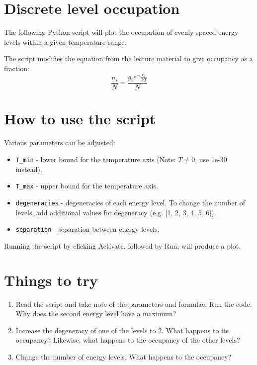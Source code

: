 \documentclass{article}
\begin{document}
\section{Discrete level occupation}

The following Python script will plot the occupation of evenly spaced energy levels within a given temperature range. \par\medskip 
\noindent The script modifies the equation from the lecture material to give occupancy as a fraction:
\[\frac{n_i}{N} = \frac{g_ie^-\frac{e_i}{kT}}{N} \]

\section{How to use the script}
Various parameters can be adjusted: 
\begin{itemize}
\item \texttt{T\_min} - lower bound for the temperature axis (Note: $T\neq0$, use 1e-30 instead).
\item \texttt{T\_max} - upper bound for the temperature axis.
\item \texttt{degeneracies} - degeneracies of each energy level. To change the number of levels, add additional values for degeneracy (e.g. [1, 2, 3, 4, 5, 6]).
\item \texttt{separation} - separation between energy levels.
\end{itemize}
Running the script by clicking Activate, followed by Run, will produce a plot.


\section{Things to try}
\begin{enumerate}
\item Read the script and take note of the parameters and formulae. Run the code. Why does the second energy level have a maximum?
\item Increase the degeneracy of one of the levels to 2. What happens to its occupancy? Likewise, what happens to the occupancy of the other levels?
\item Change the number of energy levels. What happens to the occupancy?
\end{enumerate}
\end{document}
